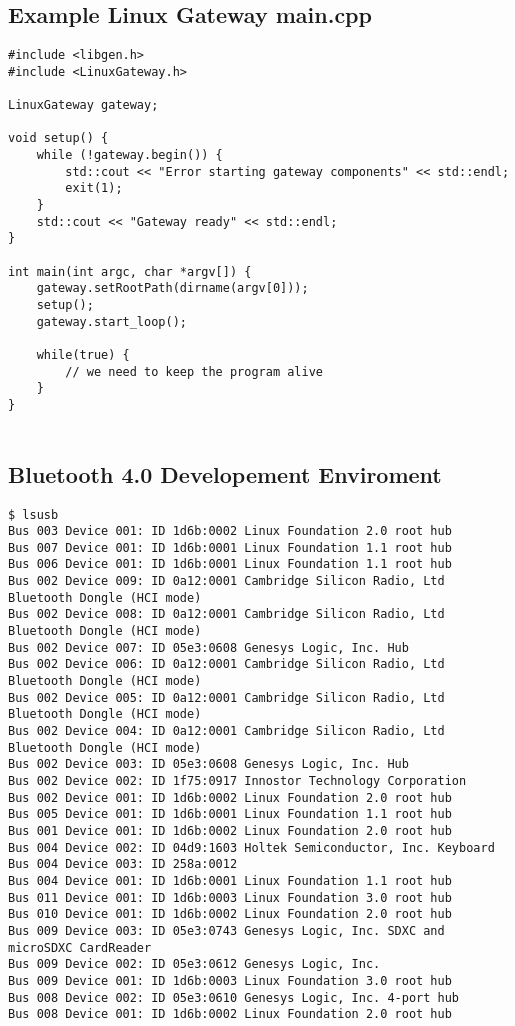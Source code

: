 \subsection{Example Linux Gateway main.cpp}\label{sec:examplelinuxgatewaymaincpp}
\begin{small}
	\begin{verbatim}
#include <libgen.h>
#include <LinuxGateway.h>

LinuxGateway gateway;

void setup() {
    while (!gateway.begin()) {
        std::cout << "Error starting gateway components" << std::endl;
        exit(1);
    }
    std::cout << "Gateway ready" << std::endl;
}

int main(int argc, char *argv[]) {
    gateway.setRootPath(dirname(argv[0]));
    setup();
    gateway.start_loop();

    while(true) {
        // we need to keep the program alive
    }
}


	\end{verbatim}
\end{small}

\subsection{Bluetooth 4.0 Developement Enviroment}\label{sec:appendixbledevenv}
\begin{small}
	\begin{verbatim}
$ lsusb
Bus 003 Device 001: ID 1d6b:0002 Linux Foundation 2.0 root hub
Bus 007 Device 001: ID 1d6b:0001 Linux Foundation 1.1 root hub
Bus 006 Device 001: ID 1d6b:0001 Linux Foundation 1.1 root hub
Bus 002 Device 009: ID 0a12:0001 Cambridge Silicon Radio, Ltd Bluetooth Dongle (HCI mode)
Bus 002 Device 008: ID 0a12:0001 Cambridge Silicon Radio, Ltd Bluetooth Dongle (HCI mode)
Bus 002 Device 007: ID 05e3:0608 Genesys Logic, Inc. Hub
Bus 002 Device 006: ID 0a12:0001 Cambridge Silicon Radio, Ltd Bluetooth Dongle (HCI mode)
Bus 002 Device 005: ID 0a12:0001 Cambridge Silicon Radio, Ltd Bluetooth Dongle (HCI mode)
Bus 002 Device 004: ID 0a12:0001 Cambridge Silicon Radio, Ltd Bluetooth Dongle (HCI mode)
Bus 002 Device 003: ID 05e3:0608 Genesys Logic, Inc. Hub
Bus 002 Device 002: ID 1f75:0917 Innostor Technology Corporation 
Bus 002 Device 001: ID 1d6b:0002 Linux Foundation 2.0 root hub
Bus 005 Device 001: ID 1d6b:0001 Linux Foundation 1.1 root hub
Bus 001 Device 001: ID 1d6b:0002 Linux Foundation 2.0 root hub
Bus 004 Device 002: ID 04d9:1603 Holtek Semiconductor, Inc. Keyboard
Bus 004 Device 003: ID 258a:0012  
Bus 004 Device 001: ID 1d6b:0001 Linux Foundation 1.1 root hub
Bus 011 Device 001: ID 1d6b:0003 Linux Foundation 3.0 root hub
Bus 010 Device 001: ID 1d6b:0002 Linux Foundation 2.0 root hub
Bus 009 Device 003: ID 05e3:0743 Genesys Logic, Inc. SDXC and microSDXC CardReader
Bus 009 Device 002: ID 05e3:0612 Genesys Logic, Inc. 
Bus 009 Device 001: ID 1d6b:0003 Linux Foundation 3.0 root hub
Bus 008 Device 002: ID 05e3:0610 Genesys Logic, Inc. 4-port hub
Bus 008 Device 001: ID 1d6b:0002 Linux Foundation 2.0 root hub

	\end{verbatim}
\end{small}

